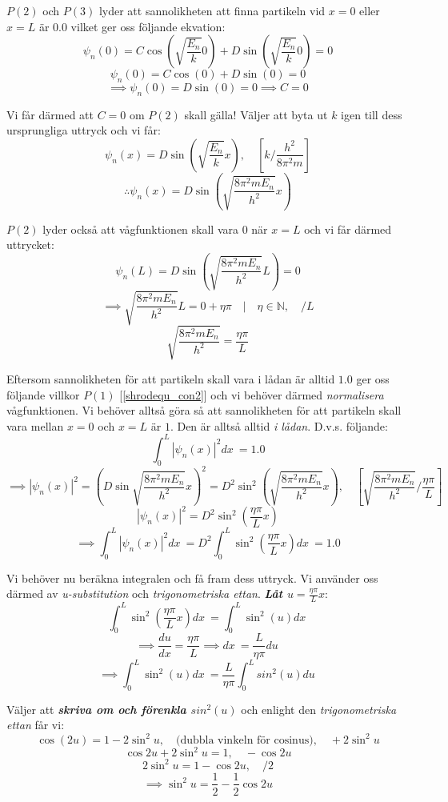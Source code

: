 \documentclass{article}
\newcommand{\shrodprob}{|\psi_n(x)|^2}
\begin{document}
$P(2)$ och $P(3)$ lyder att sannolikheten att finna partikeln vid $x=0$ eller $x=L$ är $0.0$ vilket ger oss följande ekvation:
$$
\psi_n(0) = C \cos \left(\sqrt{\frac{E_n}{k}}0\right) + D \sin \left(\sqrt{\frac{E_n}{k}}0\right) = 0
$$
$$
\psi_n(0) = C \cos \left(0\right) + D \sin \left(0\right) = 0
$$
$$
\implies \psi_n(0) = D \sin \left(0\right) = 0 \implies C = 0
$$

Vi får därmed att $C=0$ om $P(2)$ skall gälla! Väljer att byta ut $k$ igen till dess ursprungliga uttryck och vi får:
$$
\psi_n(x) = D \sin \left(\sqrt{\frac{E_n}{k}} x \right), \quad \left[k/\frac{h^2}{8 \pi ^2 m}\right]
$$
$$
\therefore \psi_n(x) = D \sin \left( \sqrt{\frac{8 \pi^2 m E_n}{h^2}} x \right)
$$

$P(2)$ lyder också att vågfunktionen skall vara $0$ när $x=L$ och vi får därmed uttrycket:
$$
\psi_n(L) = D \sin \left( \sqrt{\frac{8 \pi^2 m E_n}{h^2}} L \right) = 0
$$
$$
\implies \sqrt{\frac{8 \pi^2 m E_n}{h^2}} L = 0 + \eta\pi \quad | \quad \eta \in \mathbb{N}, \quad /L
$$
$$
\sqrt{\frac{8 \pi^2 m E_n}{h^2}} = \frac{\eta\pi}{L}
$$

Eftersom sannolikheten för att partikeln skall vara i lådan är alltid $1.0$ ger oss följande villkor $P(1)$ [\ref{shrodequ_con2}] och vi behöver därmed \emph{normalisera} vågfunktionen. Vi behöver alltså göra så att sannolikheten för att partikeln skall vara mellan $x=0$ och $x=L$ är $1$. Den är alltså alltid \emph{i lådan}. D.v.s. följande:
$$
\int_0^L \shrodprob dx\ = 1.0
$$
$$
\implies \shrodprob = \left( D\sin \sqrt{\frac{8 \pi^2 m E_n}{h^2}}x \right)^2
= D^2 \sin^2 \left( \sqrt{\frac{8 \pi^2 m E_n}{h^2}}x \right), \quad \left[ \sqrt{\frac{8 \pi^2 m E_n}{h^2}} / \frac{\eta\pi}{L}
\right]
$$
$$
\shrodprob = D^2 \sin^2 \left( \frac{\eta\pi}{L} x \right)
$$
$$
\implies \int_0^L \shrodprob dx\ = D^2 \int_0^L \sin^2\left( \frac{\eta\pi}{L} x \right) dx\ = 1.0
$$

Vi behöver nu beräkna integralen och få fram dess uttryck. Vi använder oss därmed av \emph{u-substitution} och \emph{trigonometriska ettan}. \emph{\textbf{Låt $u = \frac{\eta\pi}{L}x$}}:
$$
\int_0^L \sin^2\left( \frac{\eta\pi}{L} x \right) dx\ = \int_0^L \sin^2(u) dx\
$$
$$
\implies \frac{du}{dx} = \frac{\eta\pi}{L} \implies dx\ = \frac{L}{\eta\pi} du\
$$
$$
\implies \int_0^L \sin^2(u) dx\ = \frac{L}{\eta\pi} \int_0^L sin^2(u) du\
$$

Väljer att \emph{\textbf{skriva om och förenkla $sin^2\left(u\right)$}} och enlight den \emph{trigonometriska ettan} får vi:
$$
\cos(2u) = 1 - 2\sin^2 u, \quad \text{(dubbla vinkeln för cosinus)}, \quad +2\sin^2 u
$$
$$
\cos 2u + 2\sin^2 u = 1, \quad -\cos 2u
$$
$$
2\sin^2 u = 1 - \cos 2u, \quad /2
$$
$$
\implies \sin^2 u = \frac{1}{2} - \frac{1}{2}\cos 2u
$$
\end{document}

